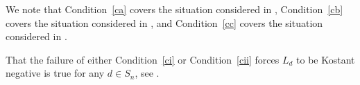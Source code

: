 \documentclass[a4paper]{amsart}
\def\HK#1{\textcolor[rgb]{.75,0.00,0.00}{[HK: #1]}}
\begin{document}
We note that Condition~\eqref{ca} covers  the situation
considered in \cite{MMM},
Condition~\eqref{cb} covers  the situation
considered in \cite{KMM,CM4}, and
Condition~\eqref{cc} covers  the situation
considered in \cite{CM2}.

That the failure of either Condition~\eqref{ci} or Condition~\eqref{cii}
forces $L_d$ to be Kostant negative is true for any $d\in S_n$,
see \cite[Proposition~8.14]{KMM}.

\end{document}
